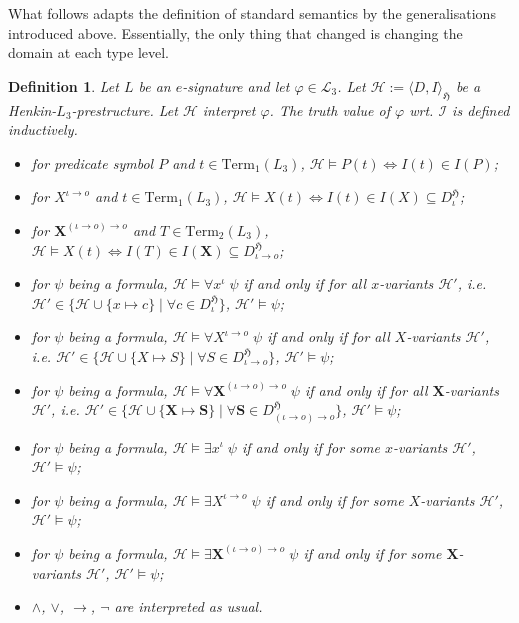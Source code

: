 \documentclass[11pt,a4paper]{article}
\newtheorem{mydef}{Definition}
\newcommand{\of}{\iota }
\newcommand{\os}{\iota \to o}
\newcommand{\ot}{(\iota \to o)\to o}
\begin{document}
What follows  adapts the definition of standard semantics by the generalisations introduced above. Essentially, the only thing that changed is changing the domain at each type level.

\begin{mydef}
Let $L$ be an $e$-signature and let $\varphi \in \mathcal{L}_3$. Let $\mathcal{H}:=\langle D, I \rangle_{\mathfrak{H}}$ be a Henkin-$L_3$-prestructure. Let $\mathcal{H}$ interpret $\varphi$. The truth value of $\varphi$ wrt. $\mathcal{I}$ is defined inductively.
\begin{itemize}
\item for predicate symbol $P$ and $t\in \mathrm{Term}_1(L_3)$, $\mathcal{H} \models P(t) \iff I(t) \in I(P)$;
\item for $X^{\os}$ and $t\in \mathrm{Term}_{1}(L_3)$, $\mathcal{H} \models X(t) \iff I(t) \in I(X) \subseteq D_{\iota}^{\mathfrak{H}}$;
\item for $\mathbf{X}^{\ot}$ and $T\in \mathrm{Term}_{2}(L_3)$, $\mathcal{H} \models X(t) \iff I(T) \in I(\mathbf{X}) \subseteq D_{\iota \to o}^{\mathfrak{H}}$;
\item for $\psi$ being a formula, $\mathcal{H}\models \forall x^{\of} \; \psi$  if and only if for all $x$-variants $\mathcal{H}'$, i.e.  $\mathcal{H}' \in \{ \mathcal{H} \cup \{x \mapsto c\} \mid \forall c \in D_{\of}^{\mathfrak{H}} \}$, $\mathcal{H}' \models \psi$;
\item for $\psi$ being a formula, $\mathcal{H}\models \forall X^{\os} \; \psi$  if and only if for all $X$-variants $\mathcal{H}'$, i.e.  $\mathcal{H}' \in \{ \mathcal{H}\cup \{X \mapsto S\} \mid \forall S \in D_{\os}^{\mathfrak{H}} \}$, $\mathcal{H}' \models \psi$;
\item for $\psi$ being a formula, $\mathcal{H} \models \forall \mathbf{X}^{\ot} \; \psi$  if and only if for all $\mathbf{X}$-variants $\mathcal{H}'$, i.e.  $\mathcal{H}' \in \{ \mathcal{H}\cup \{\mathbf{X} \mapsto \mathbf{S}\} \mid \forall \mathbf{S} \in D_{\ot}^{\mathfrak{H}} \}$, $\mathcal{H}' \models \psi$;
\item for $\psi$ being a formula, $\mathcal{H}\models \exists x^{\of} \; \psi$  if and only if for some $x$-variants $\mathcal{H}'$, $\mathcal{H}' \models \psi$;
\item for $\psi$ being a formula, $\mathcal{H}\models \exists X^{\os} \; \psi$  if and only if for some $X$-variants $\mathcal{H}'$, $\mathcal{H}' \models \psi$;
\item for $\psi$ being a formula, $\mathcal{H}\models \exists \mathbf{X}^{\ot} \; \psi$  if and only if for some $\mathbf{X}$-variants $\mathcal{H}'$, $\mathcal{H}' \models \psi$;
\item $\land$, $\lor$, $\to$, $\neg$ are interpreted as usual.
\end{itemize}
\end{mydef} 
\end{document}
